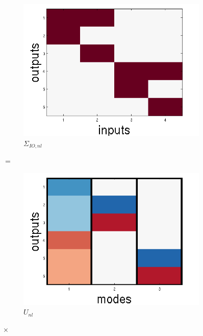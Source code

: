 \documentclass[10pt,letterpaper]{article}
\begin{document}
\begin{figure}
\centering
\begin{subfigure}{0.22\textwidth}
\includegraphics[width=\textwidth]{figures/nonlinear_IO.png}
\caption{$\Sigma_{IO,nl}$}
\end{subfigure}
\huge{$=$}
\begin{subfigure}{0.22\textwidth}
\includegraphics[width=\textwidth]{figures/U_nl.png}
\caption{$U_{nl}$}
\end{subfigure}
\LARGE{$\times$}
\begin{subfigure}{0.22\textwidth}

\end{subfigure}
\end{figure}
\end{document}

